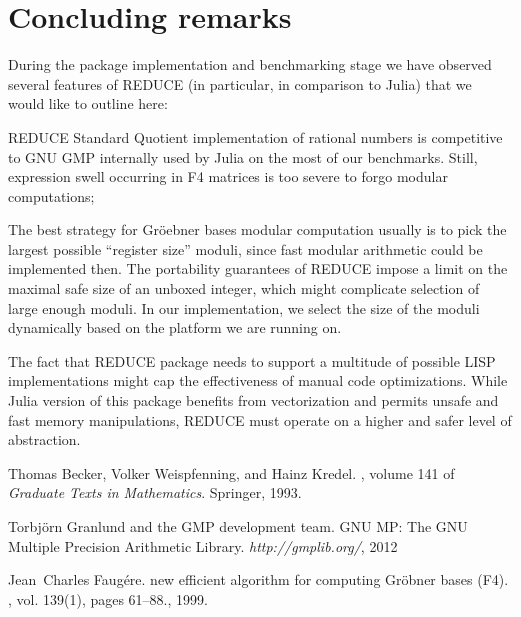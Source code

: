 \documentclass{article}
\begin{document}
\section{Concluding remarks}

During the package implementation and benchmarking stage we have observed several features of REDUCE 
(in particular, in comparison to Julia) that we would like to outline here:
%
\begin{description}
	\item REDUCE Standard Quotient implementation of rational numbers is competitive to GNU GMP \cite{GMP}
    internally used by Julia on the most of our benchmarks.
	Still, expression swell occurring in F4 matrices is too severe to forgo modular computations;
	\item The best strategy for Gr{\"o}ebner bases modular computation usually is 
	to pick the largest possible ``register size'' moduli, since fast modular arithmetic could be implemented then. 
    The portability guarantees of REDUCE impose a limit on the maximal safe size of an unboxed integer, 
    which might complicate selection of large enough moduli.
	In our implementation, we select the size of the moduli dynamically based on 
	the platform we are running on.
	\item The fact that REDUCE package needs to support a multitude of 
	possible LISP implementations might cap the effectiveness of manual 
	code optimizations.
    While Julia version of this package benefits from vectorization and permits 
    unsafe and fast memory manipulations, 
	REDUCE must operate on a higher and safer level of abstraction.
\end{description}

\begin{thebibliography}{BWK93}

Thomas Becker, Volker Weispfenning, and Hainz Kredel.
, volume 141 of {\em Graduate Texts in
  Mathematics}.
\newblock Springer, 1993.

Torbj{\"o}rn Granlund and the GMP development team.
\newblock GNU MP: The GNU Multiple Precision Arithmetic Library.
\newblock \emph{http://gmplib.org/}, 2012

Jean~Charles Faug\'ere.
 new efficient algorithm for computing {G}r{\"o}bner bases ({F}4).
, vol. 139(1), pages 61--88., 1999.

\end{thebibliography}

%
%
\end{document}
